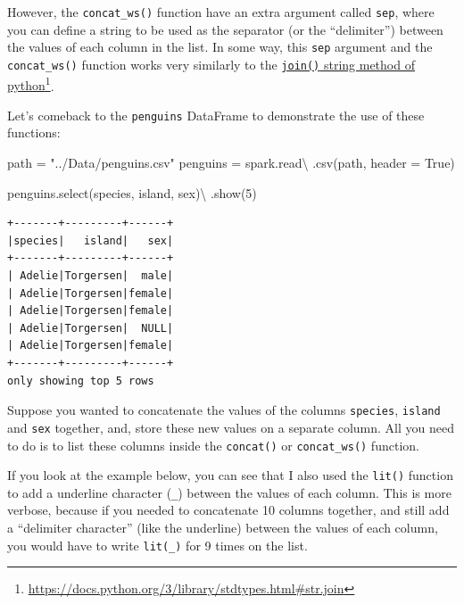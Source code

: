 \documentclass[
  11pt,
  letterpaper,
  DIV=11,
  numbers=noendperiod]{scrreprt}
\newenvironment{Shaded}{\begin{snugshade}}{\end{snugshade}}
\newcommand{\DecValTok}[1]{\textcolor[rgb]{0.68,0.00,0.00}{#1}}
\newcommand{\NormalTok}[1]{\textcolor[rgb]{0.00,0.23,0.31}{#1}}
\newcommand{\OperatorTok}[1]{\textcolor[rgb]{0.37,0.37,0.37}{#1}}
\newcommand{\StringTok}[1]{\textcolor[rgb]{0.13,0.47,0.30}{#1}}
\newcommand{\VariableTok}[1]{\textcolor[rgb]{0.07,0.07,0.07}{#1}}
\begin{document}
However, the \texttt{concat\_ws()} function have an extra argument
called \texttt{sep}, where you can define a string to be used as the
separator (or the ``delimiter'') between the values of each column in
the list. In some way, this \texttt{sep} argument and the
\texttt{concat\_ws()} function works very similarly to the
\href{https://docs.python.org/3/library/stdtypes.html\#str.join}{\texttt{join()}
string method of python}\footnote{\url{https://docs.python.org/3/library/stdtypes.html\#str.join}}.

Let's comeback to the \texttt{penguins} DataFrame to demonstrate the use
of these functions:

\begin{Shaded}
\begin{Highlighting}[]
\NormalTok{path }\OperatorTok{=} \StringTok{"../Data/penguins.csv"}
\NormalTok{penguins }\OperatorTok{=}\NormalTok{ spark.read}\OperatorTok{\textbackslash{}}
\NormalTok{    .csv(path, header }\OperatorTok{=} \VariableTok{True}\NormalTok{)}

\NormalTok{penguins.select(}\StringTok{\textquotesingle{}species\textquotesingle{}}\NormalTok{, }\StringTok{\textquotesingle{}island\textquotesingle{}}\NormalTok{, }\StringTok{\textquotesingle{}sex\textquotesingle{}}\NormalTok{)}\OperatorTok{\textbackslash{}}
\NormalTok{    .show(}\DecValTok{5}\NormalTok{)}
\end{Highlighting}
\end{Shaded}

\begin{verbatim}
+-------+---------+------+
|species|   island|   sex|
+-------+---------+------+
| Adelie|Torgersen|  male|
| Adelie|Torgersen|female|
| Adelie|Torgersen|female|
| Adelie|Torgersen|  NULL|
| Adelie|Torgersen|female|
+-------+---------+------+
only showing top 5 rows
\end{verbatim}

Suppose you wanted to concatenate the values of the columns
\texttt{species}, \texttt{island} and \texttt{sex} together, and, store
these new values on a separate column. All you need to do is to list
these columns inside the \texttt{concat()} or \texttt{concat\_ws()}
function.

If you look at the example below, you can see that I also used the
\texttt{lit()} function to add a underline character (\texttt{\_})
between the values of each column. This is more verbose, because if you
needed to concatenate 10 columns together, and still add a ``delimiter
character'' (like the underline) between the values of each column, you
would have to write \texttt{lit(\textquotesingle{}\_\textquotesingle{})}
for 9 times on the list.
\end{document}
